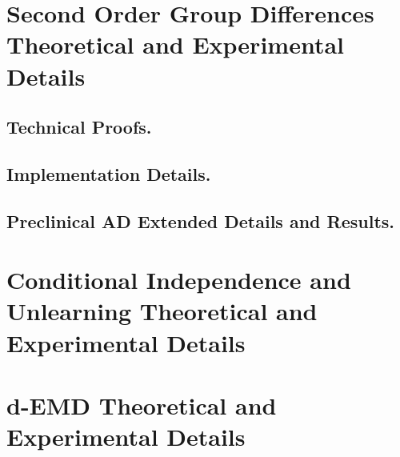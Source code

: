 
\chapter{Second Order Group Differences Theoretical and Experimental Details}
\section{Technical Proofs.}\label{app:3:proofs}

\section{Implementation Details.}\label{app:3:impl}


\section{Preclinical AD Extended Details and Results.}\label{app:3:ad}



%
\chapter{Conditional Independence and Unlearning Theoretical and Experimental Details}\label{app:5}





\chapter{d-EMD Theoretical and Experimental Details}\label{app:6}









